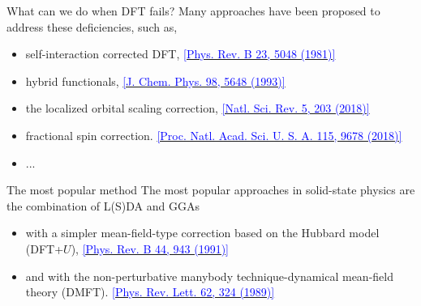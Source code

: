 \documentclass{beamer}
\begin{document}
  \begin{frame}{What can we do when DFT fails?}
    Many approaches have been proposed to address these deficiencies, such as,
    \begin{itemize}
      \item self-interaction corrected DFT, \href{https://doi.org/10.1103/physrevb.23.5048}{\textcolor{blue}{\tiny[Phys. Rev. B 23, 5048 (1981)]}}
      \item hybrid functionals, \href{https://doi.org/10.1063/1.464913}{\textcolor{blue}{\tiny[J. Chem. Phys. 98, 5648 (1993)]}}
      \item the localized orbital scaling correction, \href{https://doi.org/10.1093/nsr/nwx111}{\textcolor{blue}{\tiny[Natl. Sci. Rev. 5, 203 (2018)]}}
      \item fractional spin correction. \href{https://doi.org/10.1073/pnas.1807095115}{\textcolor{blue}{\tiny[Proc. Natl. Acad. Sci. U. S. A. 115, 9678 (2018)]}}
      \item ...
    \end{itemize}

    \begin{block}{The most popular method}
      The most popular approaches in solid-state physics are the combination of L(S)DA and GGAs
      \begin{itemize}
        \item with a simpler mean-field-type correction based on the Hubbard model (DFT+\(U\)), \href{https://doi.org/10.1103/physrevb.44.943}{\textcolor{blue}{\tiny[Phys. Rev. B 44, 943 (1991)]}}
        \item and with the non-perturbative manybody technique-dynamical mean-field theory (DMFT). \href{https://doi.org/10.1103/PhysRevLett.62.324}{\textcolor{blue}{\tiny[Phys. Rev. Lett. 62, 324 (1989)]}}
      \end{itemize}
    \end{block}

  \end{frame}
\end{document}
